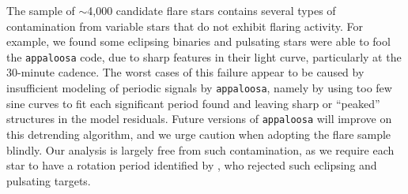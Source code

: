 \documentclass[preprint2]{aastex62}
\begin{document}
The \citet{davenport2016} sample of $\sim$4,000 candidate flare stars contains several types of contamination from variable stars that do not exhibit flaring activity. For example, we found some eclipsing binaries and pulsating stars were able to fool the {\tt appaloosa} code, due to sharp features in their light curve, particularly at the 30-minute cadence. The worst cases of this failure appear to be caused by insufficient modeling of periodic signals by {\tt appaloosa}, namely by using too few sine curves to fit each significant period found and leaving sharp or ``peaked'' structures in the model residuals. Future versions of {\tt appaloosa} will improve on this detrending algorithm, and we urge caution when adopting the \citet{davenport2016} flare sample blindly. Our analysis is largely free from such contamination, as we require each star to have a rotation period identified by \citet{mcquillan2014}, who rejected such eclipsing and pulsating targets.
\end{document}
